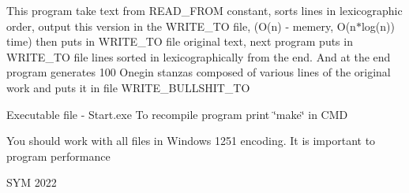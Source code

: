 This program take text from READ\+\_\+\+FROM constant, sorts lines in lexicographic order, output this version in the WRITE\+\_\+\+TO file, (O(n) -\/ memery, O(n$\ast$log(n)) time) then puts in WRITE\+\_\+\+TO file original text, next program puts in WRITE\+\_\+\+TO file lines sorted in lexicographically from the end. And at the end program generates 100 Onegin stanzas composed of various lines of the original work and puts it in file WRITE\+\_\+\+BULLSHIT\+\_\+\+TO

Executable file -\/ Start.\+exe To recompile program print \char`\"{}make\char`\"{} in CMD

You should work with all files in Windows 1251 encoding. It is important to program performance

SYM 2022 